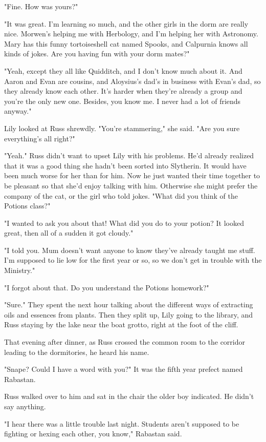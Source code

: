 "Fine. How was yours?"

"It was great. I'm learning so much, and the other girls in the dorm are really nice. Morwen's helping me with Herbology, and I'm helping her with Astronomy. Mary has this funny tortoiseshell cat named Spooks, and Calpurnia knows all kinds of jokes. Are you having fun with your dorm mates?"

"Yeah, except they all like Quidditch, and I don't know much about it. And Aaron and Evan are cousins, and Aloysius's dad's in business with Evan's dad, so they already know each other. It's harder when they're already a group and you're the only new one. Besides, you know{\el} me. I never had a lot of{\el} friends anyway."

Lily looked at Russ shrewdly. "You're stammering," she said. "Are you sure everything's all right?"

"Yeah." Russ didn't want to upset Lily with his problems. He'd already realized that it was a good thing she hadn't been sorted into Slytherin. It would have been much worse for her than for him. Now he just wanted their time together to be pleasant so that she'd enjoy talking with him. Otherwise she might prefer the company of the cat, or the girl who told jokes. "What did you think of the Potions class?"

"I wanted to ask you about that! What did you do to your potion? It looked great, then all of a sudden it got cloudy."

"I told you. Mum doesn't want anyone to know they've already taught me stuff. I'm supposed to lie low for the first year or so, so we don't get in trouble with the Ministry."

"I forgot about that. Do you understand the Potions homework?"

"Sure." They spent the next hour talking about the different ways of extracting oils and essences from plants. Then they split up, Lily going to the library, and Russ staying by the lake near the boat grotto, right at the foot of the cliff.

That evening after dinner, as Russ crossed the common room to the corridor leading to the dormitories, he heard his name.

"Snape? Could I have a word with you?" It was the fifth year prefect named Rabastan.

Russ walked over to him and sat in the chair the older boy indicated. He didn't say anything.

"I hear there was a little trouble last night. Students aren't supposed to be fighting or hexing each other, you know," Rabastan said.

